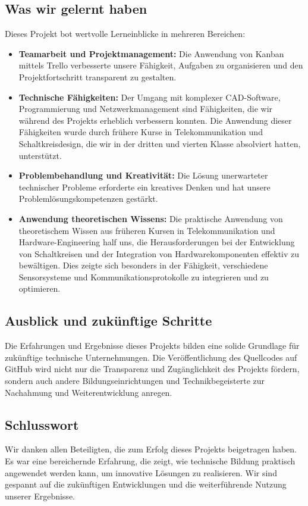 \subsection{Was wir gelernt haben}
Dieses Projekt bot wertvolle Lerneinblicke in mehreren Bereichen:
\begin{itemize}
    \item \textbf{Teamarbeit und Projektmanagement:} Die Anwendung von Kanban mittels Trello verbesserte unsere Fähigkeit, Aufgaben zu organisieren und den Projektfortschritt transparent zu gestalten.
    \item \textbf{Technische Fähigkeiten:} Der Umgang mit komplexer CAD-Software, Programmierung und Netzwerkmanagement sind Fähigkeiten, die wir während des Projekts erheblich verbessern konnten. Die Anwendung dieser Fähigkeiten wurde durch frühere Kurse in Telekommunikation und Schaltkreisdesign, die wir in der dritten und vierten Klasse absolviert hatten, unterstützt.
    \item \textbf{Problembehandlung und Kreativität:} Die Lösung unerwarteter technischer Probleme erforderte ein kreatives Denken und hat unsere Problemlösungskompetenzen gestärkt.
    \item \textbf{Anwendung theoretischen Wissens:} Die praktische Anwendung von theoretischem Wissen aus früheren Kursen in Telekommunikation und Hardware-Engineering half uns, die Herausforderungen bei der Entwicklung von Schaltkreisen und der Integration von Hardwarekomponenten effektiv zu bewältigen. Dies zeigte sich besonders in der Fähigkeit, verschiedene Sensorsysteme und Kommunikationsprotokolle zu integrieren und zu optimieren.
\end{itemize}

\subsection{Ausblick und zukünftige Schritte}
Die Erfahrungen und Ergebnisse dieses Projekts bilden eine solide Grundlage für zukünftige technische Unternehmungen. Die Veröffentlichung des Quellcodes auf GitHub wird nicht nur die Transparenz und Zugänglichkeit des Projekts fördern, sondern auch andere Bildungseinrichtungen und Technikbegeisterte zur Nachahmung und Weiterentwicklung anregen.

\subsection{Schlusswort}
Wir danken allen Beteiligten, die zum Erfolg dieses Projekts beigetragen haben. Es war eine bereichernde Erfahrung, die zeigt, wie technische Bildung praktisch angewendet werden kann, um innovative Lösungen zu realisieren. Wir sind gespannt auf die zukünftigen Entwicklungen und die weiterführende Nutzung unserer Ergebnisse.

